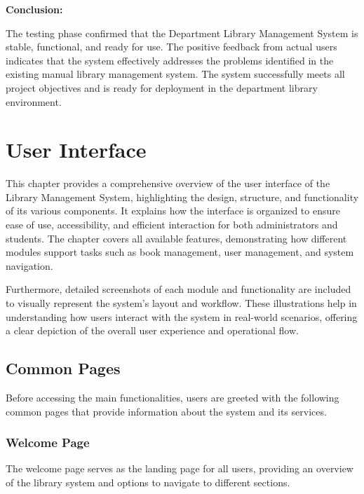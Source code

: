 \documentclass[12pt,a4paper]{report}
\begin{document}
\textbf{Conclusion:}

The testing phase confirmed that the Department Library Management System is stable, functional, and ready for use. The positive feedback from actual users indicates that the system effectively addresses the problems identified in the existing manual library management system. The system successfully meets all project objectives and is ready for deployment in the department library environment.




\newpage
            
\chapter{User Interface}
\label{chap:userinterface}

This chapter provides a comprehensive overview of the user interface of the Library Management System, highlighting the design, structure, and functionality of its various components. It explains how the interface is organized to ensure ease of use, accessibility, and efficient interaction for both administrators and students. The chapter covers all available features, demonstrating how different modules support tasks such as book management, user management, and system navigation.

Furthermore, detailed screenshots of each module and functionality are included to visually represent the system’s layout and workflow. These illustrations help in understanding how users interact with the system in real-world scenarios, offering a clear depiction of the overall user experience and operational flow.

\section{Common Pages}
\label{sec:common}

Before accessing the main functionalities, users are greeted with the following common pages that provide information about the system and its services.

\subsection{Welcome Page}
\label{subsec:welcome}

The welcome page serves as the landing page for all users, providing an overview of the library system and options to navigate to different sections.
\end{document}
